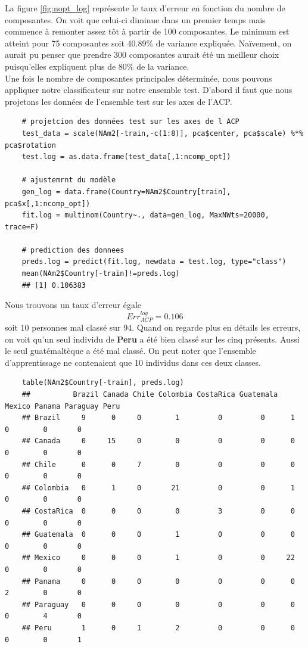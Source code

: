 \documentclass[12pt,a4paper]{article}
\begin{document}
La figure \ref{fig:nopt_log} représente le taux d'erreur en fonction du nombre de composantes. On voit que celui-ci diminue dans un premier temps mais commence à remonter assez tôt à partir de 100 composantes. Le minimum est atteint pour 75 composantes soit 40.89\% de variance expliquée. Naïvement, on aurait pu penser que prendre 300 composantes aurait été un meilleur choix puisqu'elles expliquent plus de 80\% de la variance.\vspace{3mm}\\
Une fois le nombre de composantes principales déterminée, nous pouvons appliquer notre classificateur sur notre ensemble test. D'abord il faut que nous projetons les données de l'ensemble test sur les axes de l'ACP.
\begin{lstlisting}
	# projetcion des données test sur les axes de l ACP
	test_data = scale(NAm2[-train,-c(1:8)], pca$center, pca$scale) %*% pca$rotation
	test.log = as.data.frame(test_data[,1:ncomp_opt])
	
	# ajustemrnt du modèle
	gen_log = data.frame(Country=NAm2$Country[train], pca$x[,1:ncomp_opt])
	fit.log = multinom(Country~., data=gen_log, MaxNWts=20000, trace=F)
	
	# prediction des donnees
	preds.log = predict(fit.log, newdata = test.log, type="class")
	mean(NAm2$Country[-train]!=preds.log)
	## [1] 0.106383
\end{lstlisting}
Nous trouvons un taux d'erreur égale \[Err_{ACP}^{log} = 0.106\] soit 10 personnes mal classé sur 94. Quand on regarde plus en détails les erreurs, on voit qu'un seul individu de \textbf{Peru} a été bien classé sur les cinq présents. Aussi le seul guatémaltèque a été mal classé. On peut noter que l'ensemble d'apprentissage ne contenaient que 10 individus dans ces deux classes.
\begin{lstlisting}
	table(NAm2$Country[-train], preds.log)
	## 			Brazil Canada Chile Colombia CostaRica Guatemala Mexico Panama Paraguay Peru
	## Brazil     9      0     0        1         0         0      1      0        0       0
	## Canada     0     15     0        0         0         0      0      0        0       0
	## Chile      0      0     7        0         0         0      0      0        0       0
	## Colombia   0      1     0       21         0         0      1      0        0       0
	## CostaRica  0      0     0        0         3         0      0      0        0       0
	## Guatemala  0      0     0        1         0         0      0      0        0       0
	## Mexico     0      0     0        1         0         0     22      0        0       0
	## Panama     0      0     0        0         0         0      0      2        0       0
	## Paraguay   0      0     0        0         0         0      0      0        4       0
	## Peru       1      0     1        2         0         0      0      0        0       1
\end{lstlisting}
\end{document}
